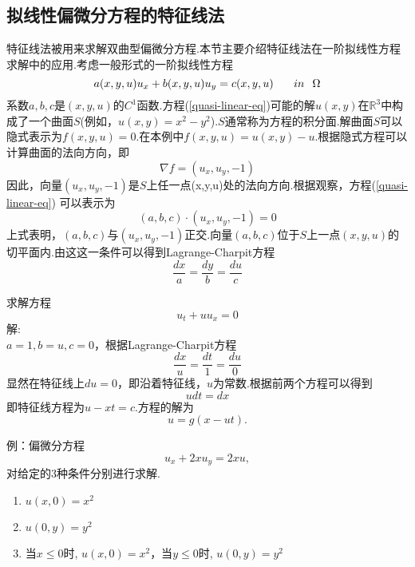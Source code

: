 \subsection{拟线性偏微分方程的特征线法}
特征线法被用来求解双曲型偏微分方程.本节主要介绍特征线法在一阶拟线性方程求解中的应用.考虑一般形式的一阶拟线性方程
\begin{equation} \label{quasi-linear-eq}
	a(x,y,u)u_x + b(x,y,u)u_y=c(x,y,u) \hspace{0.25in} in \hspace{0.1in} \Omega
\end{equation}
系数$a,b,c$是$(x,y,u)$的$C^1$函数.方程(\ref{quasi-linear-eq})可能的解$u(x,y)$在$\mathbb{R}^3$中构成了一个曲面$S$(例如，$u(x,y)=x^2-y^2$).$S$通常称为方程的积分面.解曲面$S$可以隐式表示为$f(x,y,u)=0$.在本例中$f(x,y,u)=u(x,y)-u$.根据隐式方程可以计算曲面的法向方向，即
\begin{equation}
	\nabla f = (u_x,u_y,-1)
\end{equation}
因此，向量$(u_x,u_y,-1)$是$S$上任一点(x,y,u)处的法向方向.根据观察，方程(\ref{quasi-linear-eq})
可以表示为
\begin{equation}
	(a,b,c)\cdot (u_x,u_y,-1) = 0
\end{equation}
上式表明，$(a,b,c)$与$(u_x,u_y,-1)$正交.向量$(a,b,c)$位于$S$上一点$(x,y,u)$的切平面内.由这这一条件可以得到Lagrange-Charpit方程
\begin{equation}
	\frac{dx}{a}=\frac{dy}{b}=\frac{du}{c}
\end{equation}

\begin{myexample}
	求解方程
	\begin{equation}
		u_t + uu_x = 0
	\end{equation}
	解: \\
	$a = 1, b = u, c = 0$，根据Lagrange-Charpit方程\\
	\begin{equation}
		\frac{dx}{u} = \frac{dt}{1} = \frac{du}{0}
	\end{equation}
	显然在特征线上$du=0$，即沿着特征线，$u$为常数.根据前两个方程可以得到
	\begin{equation}
		u dt= dx
	\end{equation}
	即特征线方程为$u-xt=c$.方程的解为
	\begin{equation}
		u = g(x-ut).
	\end{equation}
	
	
	
\end{myexample}
	例：偏微分方程 \cite{apde}
	\begin{equation*}
		u_x + 2xu_y = 2xu, 
	\end{equation*}
	对给定的3种条件分别进行求解.
	\begin{enumerate}
		\item $u(x,0)=x^2$
		\item $u(0,y)=y^2$
		\item 当$x \le 0$时, $u(x,0) = x^2$，当$y \le 0$时, $u(0,y) = y^2$
	\end{enumerate}
	